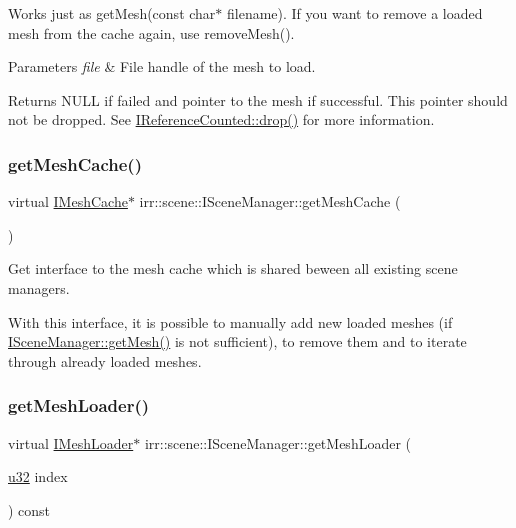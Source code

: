 Works just as get\+Mesh(const char$\ast$ filename). If you want to remove a loaded mesh from the cache again, use remove\+Mesh(). 
\begin{DoxyParams}{Parameters}
{\em file} & File handle of the mesh to load. \\
\hline
\end{DoxyParams}
\begin{DoxyReturn}{Returns}
N\+U\+LL if failed and pointer to the mesh if successful. This pointer should not be dropped. See \hyperlink{classirr_1_1IReferenceCounted_a03856a09355b89d178090c4a5f738543}{I\+Reference\+Counted\+::drop()} for more information. 
\end{DoxyReturn}
\mbox{\label{classirr_1_1scene_1_1ISceneManager_a45d89c816e33abe0e77eb063d7ce58a8}} 
\subsubsection{\texorpdfstring{get\+Mesh\+Cache()}{getMeshCache()}}
{\footnotesize\ttfamily virtual \hyperlink{classirr_1_1scene_1_1IMeshCache}{I\+Mesh\+Cache}$\ast$ irr\+::scene\+::\+I\+Scene\+Manager\+::get\+Mesh\+Cache (\begin{DoxyParamCaption}{ }\end{DoxyParamCaption})\hspace{0.3cm}{\ttfamily [pure virtual]}}



Get interface to the mesh cache which is shared beween all existing scene managers. 

With this interface, it is possible to manually add new loaded meshes (if \hyperlink{classirr_1_1scene_1_1ISceneManager_a63894c3f3d46cfc385116f1705935e03}{I\+Scene\+Manager\+::get\+Mesh()} is not sufficient), to remove them and to iterate through already loaded meshes. \mbox{\label{classirr_1_1scene_1_1ISceneManager_afabf244b50875a52eb42d5d375fa40d4}} 
\subsubsection{\texorpdfstring{get\+Mesh\+Loader()}{getMeshLoader()}}
{\footnotesize\ttfamily virtual \hyperlink{classirr_1_1scene_1_1IMeshLoader}{I\+Mesh\+Loader}$\ast$ irr\+::scene\+::\+I\+Scene\+Manager\+::get\+Mesh\+Loader (\begin{DoxyParamCaption}\item[{\hyperlink{namespaceirr_a0416a53257075833e7002efd0a18e804}{u32}}]{index }\end{DoxyParamCaption}) const\hspace{0.3cm}{\ttfamily [pure virtual]}}



